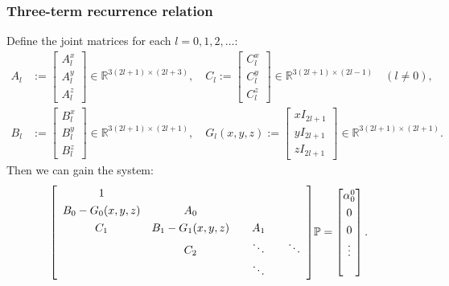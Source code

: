 \documentclass[10pt]{beamer}
\newcommand{\R}{\mathbb{R}}
\newcommand{\bigP}{\mathbb{P}}
\begin{document}
\frame
{
    \frametitle{Three-term recurrence relation}

Define the joint matrices for each \(l = 0, 1, 2, \dots\):
\begin{align}
A_l &:= \begin{bmatrix}
		A^x_l \\
		A^y_l \\
		A^z_l
	    \end{bmatrix} \in \R^{3(2l+1)\times(2l+3)}, \quad
C_l := \begin{bmatrix}
		C^x_l \\
		C^y_l \\
		C^z_l
	    \end{bmatrix} \in \R^{3(2l+1)\times(2l-1)} \quad (l \ne 0), \\
B_l &:= \begin{bmatrix}
		B^x_l \\
		B^y_l \\
		B^z_l
	    \end{bmatrix} \in \R^{3(2l+1)\times(2l+1)}, \quad
G_l(x,y,z) := \begin{bmatrix}
		xI_{2l+1} \\
		yI_{2l+1} \\
		zI_{2l+1}
	    \end{bmatrix} \in \R^{3(2l+1)\times(2l+1)}.
\end{align}
Then we can gain the system:
\begin{align}
\renewcommand\arraystretch{1.3}
\mleft[
\begin{array}{cccc}
		1  & & & \\
		B_0-G_0(x,y,z) & A_0 & & \\
		C_1 & B_1-G_1(x,y,z) & \quad A_1 \quad & \\
		& C_2 & \ddots & \ddots \\
		& & \ddots &
\end{array}
\mright]
\bigP
=
\begin{bmatrix}
	\alpha^0_0 \\ 0 \\ 0 \\ \vdots \\ \\
\end{bmatrix}.
\end{align}

}
\end{document}
